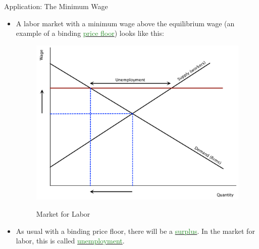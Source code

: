 \documentclass[xcolor={dvipsnames},pdf, hyperref={colorlinks=true, citecolor=ForestGreen, linkcolor=BlueViolet, urlcolor=Magenta}]{beamer}
\newcommand{\blank}[0]{}
\newcommand{\ddp}[1]{{\textcolor{ForestGreen}{#1}}}
\newcommand{\dd}[1]{{\underline{\textcolor{ForestGreen}{#1}}}}
\begin{document}
\begin{frame}{Application: The Minimum Wage}
	\begin{itemize}
		\item A labor market with a minimum wage above the equilibrium wage (an example of a binding \dd{price floor}) looks like this:
	\blank\blank\blank\blank
			\begin{figure}[H]
				\centering
				\ddp{\includegraphics[scale=.25]{plot39.pdf}}
				\caption{Market for Labor}
			\end{figure}
	\item As usual with a binding price floor, there will be a \dd{surplus}. In the market for labor, this is called \dd{unemployment}.
	\end{itemize}
\end{frame}
\end{document}
